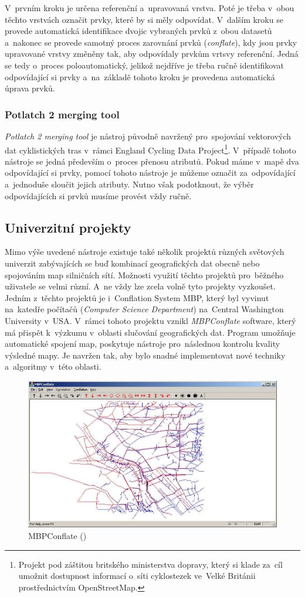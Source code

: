 V~prvním kroku je určena referenční a~upravovaná vrstva. Poté je třeba v~obou
těchto vrstvách označit prvky, které by si měly odpovídat. V~dalším kroku se 
provede automatická identifikace dvojic vybraných prvků z~obou datasetů 
a~nakonec se provede samotný proces zarovnání prvků (\textit{conflate}), kdy 
jsou prvky upravované vrstvy změněny tak, aby odpovídaly prvkům vrtsvy 
referenční. Jedná se tedy o~proces poloautomatický, jelikož nejdříve je třeba
ručně identifikovat odpovídající si prvky a~na~základě tohoto kroku je 
provedena automatická úprava prvků.


\subsubsection{Potlatch 2 merging tool}

\textit{Potlatch 2 merging tool} je nástroj původně navržený pro~spojování 
vektorových dat cyklistických tras v~rámci England Cycling Data 
Project\footnote{Projekt pod záštitou britského ministerstva dopravy, 
který si klade za~cíl umožnit dostupnost informací o~síti cyklostezek
ve~Velké Británii prostřednictvím OpenStreetMap.}. %
V~případě tohoto nástroje se jedná především o~proces přenosu atributů. 
Pokud máme v~mapě dva odpovídající si prvky, pomocí tohoto nástroje je 
můžeme označit za~odpovídající a~jednoduše sloučit jejich atributy. Nutno 
však podotknout, že výběr odpovídajících si prvků musíme provést vždy ručně. 


\subsection{Univerzitní projekty}
\label{univerzitní}

Mimo výše uvedené nástroje existuje také několik projektů různých světových
univerzit zabývajících se buď kombinací geo\-grafických dat obecně nebo 
spojováním map silničních sítí. Možnosti využití těchto projektů pro~běžného
uživatele se velmi různí. A~ne vždy lze zcela volně tyto projekty vyzkoušet. 
Jedním z~těchto projektů je i~Conflation System MBP, který byl vyvinut 
na~katedře počítačů (\textit{Computer Science Department}) na~Central Washington 
University v~USA. V~rámci tohoto projektu vznikl \textit{MBPConflate} 
software, který má přispět k~výzkumu v~oblasti slučování geo\-grafických dat. 
Program umožňuje automatické spojení map, poskytuje nástroje pro~následnou 
kontrolu kvali\-ty výsledné mapy. Je navržen tak, aby bylo snadné implementovat
nové techniky a~algoritmy v~této oblasti.  

\label{mbppic}
  \begin{figure}[hbt]
    \centering
      \includegraphics[width=350pt]{./pictures/MBPconflate.png}
      \caption{MBPConflate ()}
      \label{fig:mbp}
  \end{figure}
